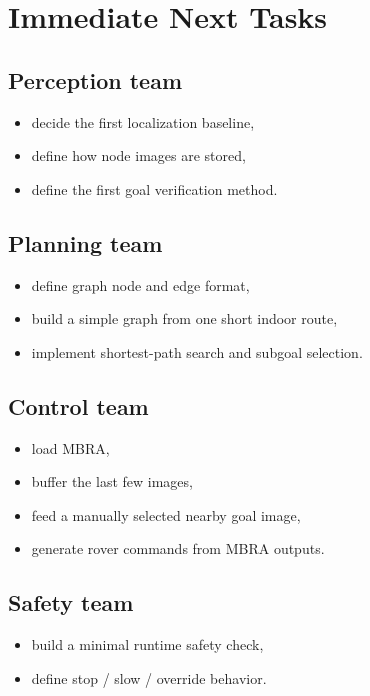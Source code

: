 \documentclass[11pt,a4paper]{article}
\begin{document}
\section{Immediate Next Tasks}

\subsection*{Perception team}
\begin{itemize}[nosep]
  \item decide the first localization baseline,
  \item define how node images are stored,
  \item define the first goal verification method.
\end{itemize}

\subsection*{Planning team}
\begin{itemize}[nosep]
  \item define graph node and edge format,
  \item build a simple graph from one short indoor route,
  \item implement shortest-path search and subgoal selection.
\end{itemize}

\subsection*{Control team}
\begin{itemize}[nosep]
  \item load MBRA,
  \item buffer the last few images,
  \item feed a manually selected nearby goal image,
  \item generate rover commands from MBRA outputs.
\end{itemize}

\subsection*{Safety team}
\begin{itemize}[nosep]
  \item build a minimal runtime safety check,
  \item define stop / slow / override behavior.
\end{itemize}
\end{document}

